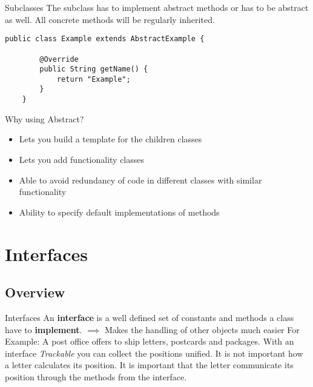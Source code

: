 \begin{frame}[fragile]{Subclasses}
	The subclass has to implement abstract methods or has to be abstract as well.
	All concrete methods will be regularly inherited.
	\begin{lstlisting}[escapechar=!]
	public class Example extends AbstractExample {
	    
	    @Override
	    public String getName() {
	        return "Example";	    
	    }
	}	
	\end{lstlisting}
\end{frame}

\begin{frame}{Why using Abstract?}
	\begin{itemize}
		\item Lets you build a template for the children classes
		\vspace{0.5cm}
		\item Lets you add functionality classes
		\vspace{0.5cm}
		\item Able to avoid redundancy of code in different classes with similar functionality
		\vspace{0.5cm}
		\item Ability to specify default implementations of methods
	\end{itemize}
\end{frame}

\section{Interfaces}
\subsection{Overview}
\begin{frame}{Interfaces}
	An \textbf{interface} is a well defined set of constants and methods a class have to \textbf{implement}.
	\vfill
	$\implies$ Makes the handling of other objects much easier
	\vfill
	\pause
	For Example: A post office offers to ship letters, postcards and packages. With an interface
	\emph{Trackable} you can collect the positions unified. 
	It is not important how a letter calculates its position.
	It is important that the letter communicate its position through the methods from the interface.
\end{frame}
